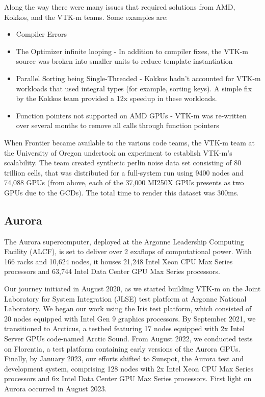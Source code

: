 Along the way there were many issues that required solutions from AMD, Kokkos, and the VTK-m teams. Some examples are:
\begin{itemize}
    \item Compiler Errors
    \item The Optimizer infinite looping - In addition to compiler fixes, the VTK-m source was broken into smaller units to reduce template instantiation
    \item Parallel Sorting being Single-Threaded - Kokkos hadn't accounted for VTK-m workloads that used integral types (for example, sorting keys). A simple fix by the Kokkos team provided a 12x speedup in these workloads.
    \item Function pointers not supported on AMD GPUs - VTK-m was re-written over several months to remove all calls through function pointers
\end{itemize}

When Frontier became available to the various code teams, the VTK-m team at the University of Oregon undertook an experiment to establish VTK-m's scalability. The team created synthetic perlin noise data set consisting of 80 trillion cells, that was distributed for a full-system run using 9400 nodes and 74,088 GPUs (from above, each of the 37,000 MI250X GPUs presents as two GPUs due to the GCDs). The total time to render this dataset was 300ms.


\subsection{Aurora}


The Aurora supercomputer, deployed at the Argonne Leadership Computing Facility (ALCF), is set to deliver over 2 exaflops of computational power. With 166 racks and 10,624 nodes, it houses 21,248 Intel Xeon CPU Max Series processors and 63,744 Intel Data Center GPU Max Series processors.

Our journey initiated in August 2020, as we started building VTK-m on the Joint Laboratory for System Integration (JLSE) test platform at Argonne National Laboratory. We began our work using the Iris test platform, which consisted of 20 nodes equipped with Intel Gen 9 graphics processors. By September 2021, we transitioned to Arcticus, a testbed featuring 17 nodes equipped with 2x Intel Server GPUs code-named Arctic Sound. From August 2022, we conducted tests on Florentia, a test platform containing early versions of the Aurora GPUs. Finally, by January 2023, our efforts shifted to Sunspot, the Aurora test and development system, comprising 128 nodes with 2x Intel Xeon CPU Max Series processors and 6x Intel Data Center GPU Max Series processors. First light on Aurora occurred in August 2023.

